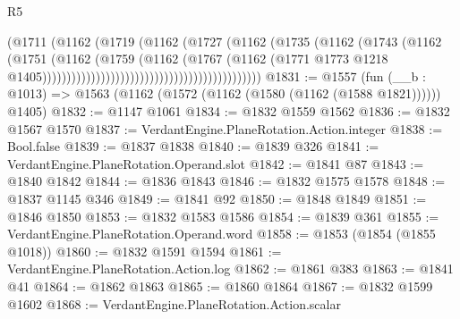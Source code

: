 \begin{lexlean}{R5}
\begin{coremodule}
                                                            (@1711
                                                              (@1162
                                                                (@1719
                                                                  (@1162
                                                                    (@1727
                                                                      (@1162
                                                                        (@1735
                                                                          (@1162
                                                                            (@1743
                                                                              (@1162
                                                                                (@1751
                                                                                  (@1162
                                                                                    (@1759
                                                                                      (@1162
                                                                                        (@1767
                                                                                          (@1162
                                                                                            (@1771
                                                                                              @1773
                                                                                              @1218
                                                                                              @1405)))))))))))))))))))))))))))))))))))))))))))))
@1831 := @1557
    (fun (__b : @1013) => @1563 (@1162 (@1572 (@1162 (@1580 (@1162 (@1588 @1821)))))) @1405)
@1832 := @1147 @1061
@1834 := @1832 @1559 @1562
@1836 := @1832 @1567 @1570
@1837 := VerdantEngine.PlaneRotation.Action.integer
@1838 := Bool.false
@1839 := @1837 @1838
@1840 := @1839 @326
@1841 := VerdantEngine.PlaneRotation.Operand.slot
@1842 := @1841 @87
@1843 := @1840 @1842
@1844 := @1836 @1843
@1846 := @1832 @1575 @1578
@1848 := @1837 @1145 @346
@1849 := @1841 @92
@1850 := @1848 @1849
@1851 := @1846 @1850
@1853 := @1832 @1583 @1586
@1854 := @1839 @361
@1855 := VerdantEngine.PlaneRotation.Operand.word
@1858 := @1853 (@1854 (@1855 @1018))
@1860 := @1832 @1591 @1594
@1861 := VerdantEngine.PlaneRotation.Action.log
@1862 := @1861 @383
@1863 := @1841 @41
@1864 := @1862 @1863
@1865 := @1860 @1864
@1867 := @1832 @1599 @1602
@1868 := VerdantEngine.PlaneRotation.Action.scalar

\end{coremodule}
\end{lexlean}
